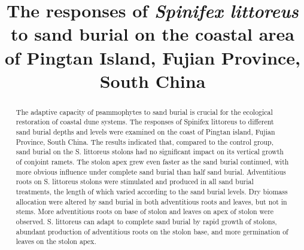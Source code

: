 \documentclass[]{interact}
\theoremstyle{plain}%
\theoremstyle{definition}
\theoremstyle{remark}
\begin{document}

\title{The responses of \textit{Spinifex littoreus} to sand burial on the coastal area of Pingtan Island, Fujian Province, South China}

\author{
}

\maketitle

\begin{abstract}
\label{abstract}
The adaptive capacity of psammophytes to sand burial is crucial for the ecological restoration of coastal dune systems. 
The responses of Spinifex littoreus to different sand burial depths and levels were examined on the coast of Pingtan island, Fujian Province, South China. 
The results indicated that, compared to the control group, sand burial on the S. littoreus stolons had no significant impact on its vertical growth of conjoint ramets. 
The stolon apex grew even faster as the sand burial continued, with more obvious influence under complete sand burial than half sand burial. 
Adventitious roots on S. littoreus stolons were stimulated and produced in all sand burial treatments, the length of which varied according to the sand burial levels. 
Dry biomass allocation were altered by sand burial in both adventitious roots and leaves, but not in stems. 
More adventitious roots on base of stolon and leaves on apex of stolon were observed. 
S. littoreus can adapt to complete sand burial by rapid growth of stolons, abundant production of adventitious roots on the stolon base, and more germination of leaves on the stolon apex.
\end{abstract}
\end{document}
